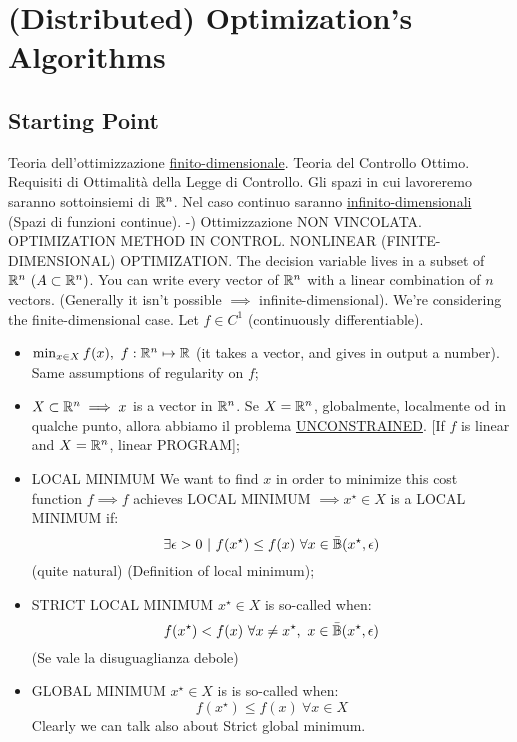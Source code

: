
\chapter{(Distributed) Optimization's Algorithms}
\label{cap:algoptzs}

\section{Starting Point}

Teoria dell'ottimizzazione \underline{finito-dimensionale}. Teoria del Controllo Ottimo. Requisiti di Ottimalità della Legge di Controllo. Gli spazi in cui lavoreremo saranno sottoinsiemi di $\mathbb{R}^n$. Nel caso continuo saranno \underline{infinito-dimensionali} (Spazi di funzioni continue).
-) Ottimizzazione NON VINCOLATA. OPTIMIZATION METHOD IN CONTROL. NONLINEAR (FINITE-DIMENSIONAL) OPTIMIZATION. The decision variable lives in a subset of $\mathbb{R}^n\ (A \subset \mathbb{R}^n)$. You can write every vector of $\mathbb{R}^n$ with a linear combination of $n$ vectors. (Generally it isn't possible $\implies$ infinite-dimensional). We're considering the finite-dimensional case. Let $f \in C^1$ (continuously differentiable).
\begin{itemize}
\item $\min_{x\in X}{f(x)},\ f:\R^n\mapsto\R$ (it takes a vector, and gives in output a number). Same assumptions of regularity on $f$;
\item $X \subset \mathbb{R}^n \implies x$ is a vector in $\mathbb{R}^n$. Se $X=\mathbb{R}^n$, globalmente, localmente od in qualche punto, allora abbiamo il problema \underline{UNCONSTRAINED}. [If $f$ is linear and $X=\mathbb{R}^n$, linear PROGRAM];
\item{LOCAL MINIMUM} We want to find $x$ in order to minimize this cost function $f \implies f$ achieves LOCAL MINIMUM $\implies x^\star \in X$ is a LOCAL MINIMUM if:
\[
	\exists \epsilon > 0\ |\ f(x^\star) \leq f(x)\ \forall x \in \bar{\mathbb{B}}(x^\star, \epsilon)
\]
(quite natural) (Definition of local minimum);
\item{STRICT LOCAL MINIMUM} $x^\star \in X$ is so-called when:
\[
	f(x^\star) < f(x)\ \forall x \neq x^\star,\ x \in \cball(x^\star, \epsilon)
\]
(Se vale la disuguaglianza debole)
\item{GLOBAL MINIMUM} $x^\star \in X$ is is so-called when:
\[
	f(x^\star) \leq f(x)\ \forall x \in X
\]
Clearly we can talk also about Strict global minimum.
\end{itemize}

